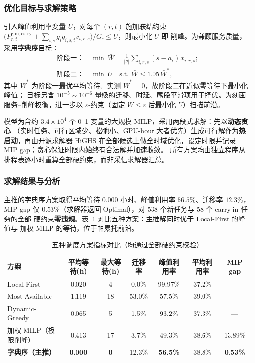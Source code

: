 \documentclass[UTF8,a4paper,zihao=-4]{ctexart}
\begin{document}
\subsubsection{优化目标与求解策略}
引入峰值利用率变量 $U$，对每个 $(r,t)$ 施加联结约束
$\big(P^{\mathrm{gpu,carry}}_{r,t}+\sum_{i,s} g_i q_{i,s,t}x_{i,r,s}\big)/G_r\le U$，则最小化 $U$ 即
削峰。为兼顾服务质量，采用\textbf{字典序}目标\cite{公茂果2009进化多目标}：
\begin{align}
\textbf{阶段一：}\ & \min\ \bar{W}=\tfrac{1}{|\mathcal{I}|}\textstyle\sum_{i,r,s}(s-a_i)\,x_{i,r,s};\\
\textbf{阶段二：}\ & \min\ U \quad\text{s.t.}\ \ \bar{W}\le 1.05\,\bar{W}^\ast,
\end{align}
其中 $\bar{W}^\ast$ 为阶段一最优平均等待。实测 $\bar{W}^\ast=0$，故阶段二在近似零等待下最小化峰值；
目标另含 $10^{-5}\!\sim\!10^{-6}$ 量级的迁移、时延、尾段平滑项用于择优。为刻画服务--削峰权衡，进一步以
$\varepsilon$-约束（固定 $\bar{W}\le\varepsilon$ 后最小化 $U$）扫描前沿\cite{mavrotas2009eps,公茂果2009进化多目标}。

模型为含约 $3.4\times10^{4}$ 个 0--1 变量的大规模 MILP，采用两段式求解：先以\textbf{动态贪心}
（实时任务、可行区域少、松弛小、GPU-hour 大者优先）生成可行解作为\textbf{热启动}，再由开源求解器
HiGHS 在全部候选上做全时域优化，设定时限并记录 MIP gap；贪心保证时限内始终有合法解并加速收敛。
所有方案均由独立程序从排程表逐小时重算全部硬约束，而非采信求解器汇总。

\subsubsection{求解结果与分析}
主推的字典序方案取得平均等待 $\mathbf{0.000}$ 小时、峰值利用率 $\mathbf{56.5\%}$、迁移率 $12.3\%$，
MIP gap 仅 $\mathbf{0.53\%}$（求解器返回 Optimal），对 $538$ 个新任务与 $58$ 个 carry-in 任务的全部
硬约束\textbf{零违规}。表~\ref{tab:sched-compare} 对比五种方案：主推解同时优于 Local-First 的峰值与
加权 MILP 的等待，位于帕累托前沿。

\begin{table}[htbp]
\centering
\footnotesize
\caption{五种调度方案指标对比（均通过全部硬约束校验）}
\label{tab:sched-compare}
\begin{tabular}{lcccccc}
\toprule
方案 & 平均等待(h) & 最大等待(h) & 迁移率 & 峰值利用率 & 平均利用率 & MIP gap \\
\midrule
Local-First          & 0.020 & 4  & 0.0\%  & 99.97\% & 37.2\% & --- \\
Most-Available       & 1.119 & 18 & 53.0\% & 57.5\%  & 39.0\% & --- \\
Dynamic-Greedy       & 0.065 & 5  & 1.5\%  & 93.2\%  & 37.3\% & --- \\
加权 MILP（极限削峰）  & 0.413 & 17 & 3.7\%  & 49.3\%  & 38.6\% & 13.89\% \\
\textbf{字典序（主推）} & \textbf{0.000} & \textbf{0} & 12.3\% & \textbf{56.5\%} & 38.8\% & \textbf{0.53\%} \\
\bottomrule
\end{tabular}
\end{table}
\end{document}

